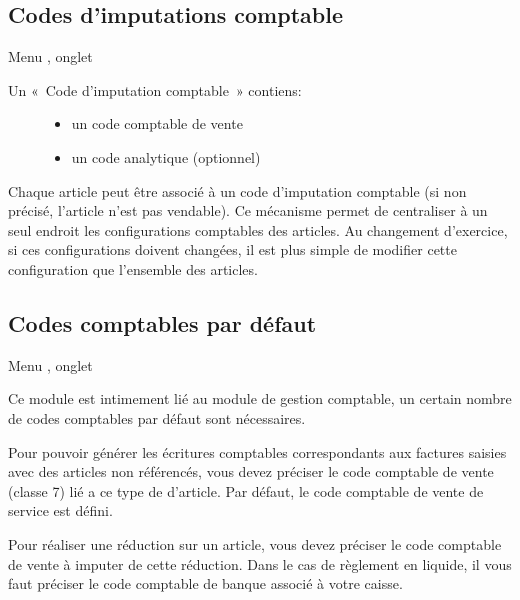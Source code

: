 \documentclass[a4paper,10pt,oneside,french]{sphinxmanual}
\begin{document}
\subsection{Codes d’imputations comptable}
\label{\detokenize{invoice/configuration:codes-d-imputations-comptable}}
Menu , onglet 
\begin{description}
\item[{Un « Code d’imputation comptable » contiens:}] \leavevmode\begin{itemize}
\item {} 
un code comptable de vente

\item {} 
un code analytique (optionnel)

\end{itemize}

\end{description}

Chaque article peut être associé à un code d’imputation comptable (si non précisé, l’article n’est pas vendable).
Ce mécanisme permet de centraliser à un seul endroit les configurations comptables des articles.
Au changement d’exercice, si ces configurations doivent changées, il est plus simple de modifier cette configuration que l’ensemble des articles.


\subsection{Codes comptables par défaut}
\label{\detokenize{invoice/configuration:codes-comptables-par-defaut}}
Menu , onglet 

Ce module est intimement lié au module de gestion comptable, un certain nombre de codes comptables par défaut sont nécessaires.

Pour pouvoir générer les écritures comptables correspondants aux factures saisies avec des articles non référencés, vous devez préciser le code comptable de vente (classe 7) lié a ce type de d’article. Par défaut, le code comptable de vente de service est défini.

Pour réaliser une réduction sur un article, vous devez préciser le code comptable de vente à imputer de cette réduction.
Dans le cas de règlement en liquide, il vous faut préciser le code comptable de banque associé à votre caisse.
\end{document}
